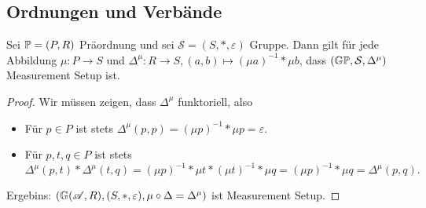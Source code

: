 \subsection{Ordnungen und Verbände}
\begin{proposition}
    \label{prop:MeasSetupÜberGruppe}
    Sei $\P = (P, R)$ Präordnung und sei $\mathcal{S} = (S,\ast,\varepsilon)$ Gruppe.
    Dann gilt für jede Abbildung $\mu\colon P \to S$ und $\Delta^\mu\colon R \to S, (a,b) \mapsto (\mu a)^{-1} \ast \mu b$,
    dass $(\G\P, \mathcal{S}, \Delta^\mu)$ Measurement Setup ist.
    \begin{proof}
        Wir müssen zeigen, dass $\Delta^\mu$ funktoriell, also
        \begin{itemize}
            \item Für $p \in P$ ist stets $\Delta^\mu(p,p) = (\mu p)^{-1} \ast \mu p = \varepsilon$.
            \item Für $p,t,q \in P$ ist stets
            $$ \Delta^\mu(p,t)\ast\Delta^\mu(t,q) = (\mu p)^{-1} \ast \mu t \ast (\mu t)^{-1} \ast \mu q = (\mu p)^{-1} \ast \mu q = \Delta^\mu(p,q). $$
        \end{itemize}
        Ergebins: $(\G(\mathscr{A},R),(S,\ast,\varepsilon),\mu\circ\Delta = \Delta^\mu)$ ist Measurement Setup.
    \end{proof}
\end{proposition}
